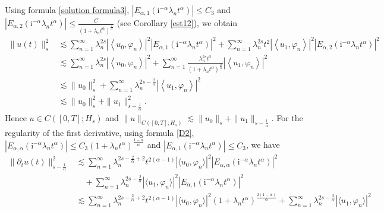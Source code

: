 \documentclass[reqno]{amsart}
\makeatletter
\renewenvironment{proof}[1][\proofname]{\par
  \pushQED{\qed}%
  \normalfont \topsep6\p@\@plus6\p@\relax
  \trivlist
  \item[\hskip\labelsep\bfseries #1\@addpunct{.}]%
}{%
  \popQED\endtrivlist\@endpefalse
}
\numberwithin{equation}{section}
\makeatother
\begin{document}
\begin{proof}
Using formula \eqref{solution formula3}, $|E_{\alpha, 1}\left(\mathrm{i}^{-\alpha}\lambda_n t^\alpha\right)|\leq C_3$ and $|E_{\alpha, 2}\left(\mathrm{i}^{-\alpha}\lambda_n t^\alpha\right)|\leq \frac{C}{(1+\lambda_{n}t^{\alpha})^\frac{1}{\alpha}}$ (see Corollary \ref{est12}), we obtain
	\begin{align}
		\|u(t)\|^2_s &\lesssim \sum_{n=1}^{\infty}\lambda_{n}^{2s}|\left\langle u_0, \varphi_n\right\rangle|^2 |E_{\alpha, 1}\left(\mathrm{i}^{-\alpha}\lambda_n t^\alpha\right)|^2 + \sum_{n=1}^{\infty}\lambda_{n}^{2s}t^2|\left\langle u_1, \varphi_n\right\rangle|^2 |E_{\alpha, 2}\left(\mathrm{i}^{-\alpha}\lambda_n t^\alpha\right)|^2 \nonumber\\
		&\lesssim \sum_{n=1}^{\infty}\lambda_{n}^{2s}|\left\langle u_0, \varphi_n\right\rangle|^2  + \sum_{n=1}^{\infty}\frac{\lambda_{n}^{2s}t^2}{(1+\lambda_{n}t^{\alpha})^\frac{2}{\alpha}}|\left\langle u_1, \varphi_n\right\rangle|^2  \nonumber\\
		&\lesssim \|u_0\|_s^2  + \sum_{n=1}^{\infty}\lambda_{n}^{2s-\frac{2}{\alpha}}|\left\langle u_1, \varphi_n\right\rangle|^2  \nonumber\\
		&\lesssim \|u_0\|_s^2  + \|u_1\|^2_{s-\frac{1}{\alpha}} \nonumber.
	\end{align}
Hence $u\in C([0,T];H_s)$ and $\|u\|_{C([0,T];H_s)}\lesssim \|u_0\|_s + \|u_1\|_{s-\frac{1}{\alpha}}$. For the regularity of the first derivative, using formula \eqref{D2}, $|E_{\alpha, \alpha}\left(\mathrm{i}^{-\alpha}\lambda_n t^\alpha\right)|\leq C_3\left(1+\lambda_n t^\alpha\right)^{\frac{1-\alpha}{\alpha}}$ and $|E_{\alpha, 1}\left(\mathrm{i}^{-\alpha}\lambda_n t^\alpha\right)|\leq C_3$, we have
	\begin{align}
		\|\partial_t u(t)\|^2_{s-\frac{1}{\alpha}}&\lesssim \sum_{n=1}^{\infty}\lambda_{n}^{2s-\frac{2}{\alpha}+2}t^{2(\alpha-1)}|\langle u_0,\varphi_{n}\rangle|^2|E_{\alpha, \alpha}\left(\mathrm{i}^{-\alpha}\lambda_n t^\alpha\right)|^2 \nonumber\\
        & \quad + \sum_{n=1}^{\infty}\lambda_{n}^{2s-\frac{2}{\alpha}}|\langle u_1,\varphi_{n}\rangle|^2|E_{\alpha, 1}\left(\mathrm{i}^{-\alpha}\lambda_n t^\alpha\right)|^2  \nonumber\\
		&\lesssim \sum_{n=1}^{\infty}\lambda_{n}^{2s-\frac{2}{\alpha}+2}t^{2(\alpha-1)}|\langle u_0,\varphi_{n}\rangle|^2\left(1+\lambda_n t^\alpha\right)^{\frac{2(1-\alpha)}{\alpha}}+ \sum_{n=1}^{\infty}\lambda_{n}^{2s-\frac{2}{\alpha}}|\langle u_1,\varphi_{n}\rangle|^2  \nonumber\\

\end{align}
\end{proof}
\end{document}
